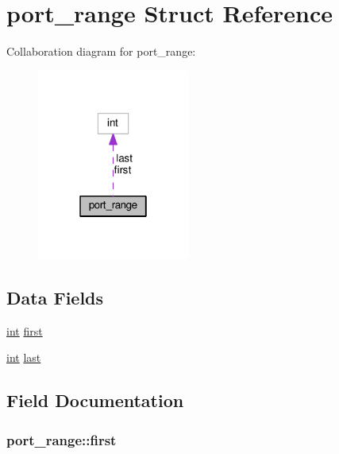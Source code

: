 \hypertarget{structport__range}{}\section{port\+\_\+range Struct Reference}
\label{structport__range}


Collaboration diagram for port\+\_\+range\+:
\nopagebreak
\begin{figure}[H]
\begin{center}
\leavevmode
\includegraphics[width=142pt]{structport__range__coll__graph}
\end{center}
\end{figure}
\subsection*{Data Fields}
\begin{DoxyCompactItemize}
\item 
\hyperlink{pcre_8txt_a42dfa4ff673c82d8efe7144098fbc198}{int} \hyperlink{structport__range_a2438b569a821f41d33772bd52030ffff}{first}
\item 
\hyperlink{pcre_8txt_a42dfa4ff673c82d8efe7144098fbc198}{int} \hyperlink{structport__range_aea12a925c88afd137f2d8abe84dd31c8}{last}
\end{DoxyCompactItemize}


\subsection{Field Documentation}
\subsubsection[{\texorpdfstring{first}{first}}]{ port\+\_\+range\+::first}\hypertarget{structport__range_a2438b569a821f41d33772bd52030ffff}{}\label{structport__range_a2438b569a821f41d33772bd52030ffff}
